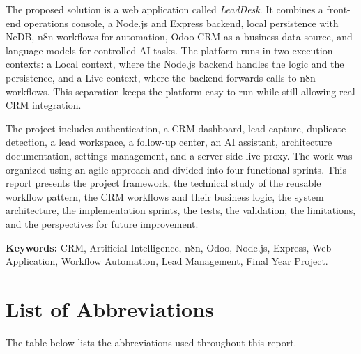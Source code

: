 \documentclass[12pt,a4paper,oneside]{report}
\begin{document}
The proposed solution is a web application called \textit{LeadDesk}. It combines a front-end operations console, a Node.js and Express backend, local persistence with NeDB, n8n workflows for automation, Odoo CRM as a business data source, and language models for controlled AI tasks. The platform runs in two execution contexts: a Local context, where the Node.js backend handles the logic and the persistence, and a Live context, where the backend forwards calls to n8n workflows. This separation keeps the platform easy to run while still allowing real CRM integration.

The project includes authentication, a CRM dashboard, lead capture, duplicate detection, a lead workspace, a follow-up center, an AI assistant, architecture documentation, settings management, and a server-side live proxy. The work was organized using an agile approach and divided into four functional sprints. This report presents the project framework, the technical study of the reusable workflow pattern, the CRM workflows and their business logic, the system architecture, the implementation sprints, the tests, the validation, the limitations, and the perspectives for future improvement.

\textbf{Keywords:} CRM, Artificial Intelligence, n8n, Odoo, Node.js, Express, Web Application, Workflow Automation, Lead Management, Final Year Project.

\clearpage
\tableofcontents
\clearpage
\listoffigures
\clearpage
\listoftables

\clearpage
\chapter*{List of Abbreviations}
The table below lists the abbreviations used throughout this report.
\end{document}
